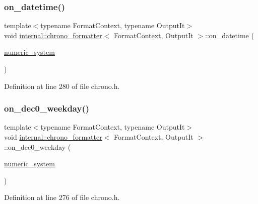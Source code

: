 \subsubsection{\texorpdfstring{on\+\_\+datetime()}{on\_datetime()}}
{\footnotesize\ttfamily template$<$typename Format\+Context, typename Output\+It$>$ \\
void \hyperlink{structinternal_1_1chrono__formatter}{internal\+::chrono\+\_\+formatter}$<$ Format\+Context, Output\+It $>$\+::on\+\_\+datetime (\begin{DoxyParamCaption}\item[{\hyperlink{namespaceinternal_a16e2a1195ca0f5beab658685f71df86b}{numeric\+\_\+system}}]{ }\end{DoxyParamCaption})\hspace{0.3cm}{\ttfamily [inline]}}



Definition at line 280 of file chrono.\+h.

\mbox{\label{structinternal_1_1chrono__formatter_a904e5619c38a0f3b993092602c243de2}} 
\subsubsection{\texorpdfstring{on\+\_\+dec0\+\_\+weekday()}{on\_dec0\_weekday()}}
{\footnotesize\ttfamily template$<$typename Format\+Context, typename Output\+It$>$ \\
void \hyperlink{structinternal_1_1chrono__formatter}{internal\+::chrono\+\_\+formatter}$<$ Format\+Context, Output\+It $>$\+::on\+\_\+dec0\+\_\+weekday (\begin{DoxyParamCaption}\item[{\hyperlink{namespaceinternal_a16e2a1195ca0f5beab658685f71df86b}{numeric\+\_\+system}}]{ }\end{DoxyParamCaption})\hspace{0.3cm}{\ttfamily [inline]}}



Definition at line 276 of file chrono.\+h.

\mbox{\label{structinternal_1_1chrono__formatter_aa61ad8285193d7b67f3d7c3130fcd668}} 
